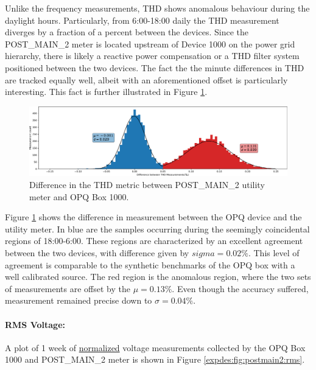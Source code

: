 Unlike the frequency measurements, THD shows anomalous behaviour during the daylight hours.
Particularly, from 6:00-18:00 daily the THD measurement diverges by a fraction of a percent between the devices.
Since the POST\_MAIN\_2 meter is located upstream of Device 1000 on the power grid hierarchy, there is likely a reactive power compensation or a THD filter system positioned between the two devices.
The fact the the minute differences in THD are tracked equally well, albeit with an aforementioned offset is particularly interesting.
This fact is further illustrated in Figure \ref{expdes:fig:postmain2:thd_diff}.

\begin{figure}[ht!]
    \centering
    \includegraphics[width=1\linewidth]{img/napali_eval/gt/gt_thd_diff.pdf}
    \caption{Difference in the THD metric between POST\_MAIN\_2 utility meter and OPQ Box 1000.}
    \label{expdes:fig:postmain2:thd_diff}
\end{figure}

Figure \ref{expdes:fig:postmain2:thd_diff} shows the difference in measurement between the OPQ device and the utility meter.
In blue are the samples occurring during the seemingly coincidental regions of 18:00-6:00.
These regions are characterized by an excellent agreement between the two devices, with difference given by $sigma =0.02\%$.
This level of agreement is comparable to the synthetic benchmarks of the OPQ box with a well calibrated source.
The red region is the anomalous region, where the two sets of measurements are offset by the $\mu = 0.13\%$.
Even though the accuracy suffered, measurement remained precise down to $\sigma=0.04\%$.

\paragraph{RMS Voltage:}
A plot of 1 week of \underline{normalized} voltage measurements collected by the OPQ Box 1000 and POST\_MAIN\_2 meter is shown in Figure \ref{expdes:fig:postmain2:rms}.

